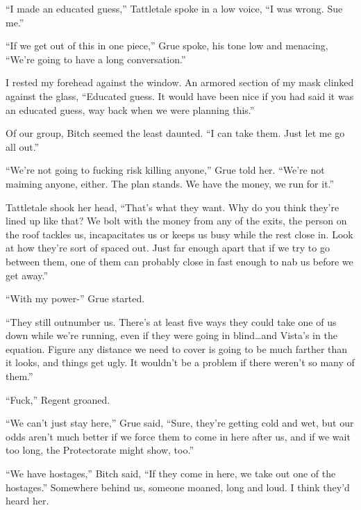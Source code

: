 ``I made an educated guess,'' Tattletale spoke in a low voice, ``I was wrong.  Sue me.''



``If we get out of this in one piece,'' Grue spoke, his tone low and menacing, ``We're going to have a long conversation.''



I rested my forehead against the window.  An armored section of my mask clinked against the glass, ``Educated guess.  It would have been nice if you had said it was an educated guess, way back when we were planning this.''



Of our group, Bitch seemed the least daunted.  ``I can take them.  Just let me go all out.''



``We're not going to fucking risk killing anyone,'' Grue told her. ``We're not maiming anyone, either. The plan stands.  We have the money, we run for it.''



Tattletale shook her head, ``That's what they want. Why do you think they're lined up like that? We bolt with the money from any of the exits, the person on the roof tackles us, incapacitates us or keeps us busy while the rest close in.  Look at how they're sort of spaced out.  Just far enough apart that if we try to go between them, one of them can probably close in fast enough to nab us before we get away.''



``With my power-'' Grue started.



``They still outnumber us. There's at least five ways they could take one of us down while we're running, even if they were going in blind\ldots and Vista's in the equation. Figure any distance we need to cover is going to be much farther than it looks, and things get ugly. It wouldn't be a problem if there weren't so many of them.''



``Fuck,'' Regent groaned.



``We can't just stay here,'' Grue said, ``Sure, they're getting cold and wet, but our odds aren't much better if we force them to come in here after us, and if we wait too long, the Protectorate might show, too.''



``We have hostages,'' Bitch said, ``If they come in here, we take out one of the hostages.''  Somewhere behind us, someone moaned, long and loud. I think they'd heard her.



